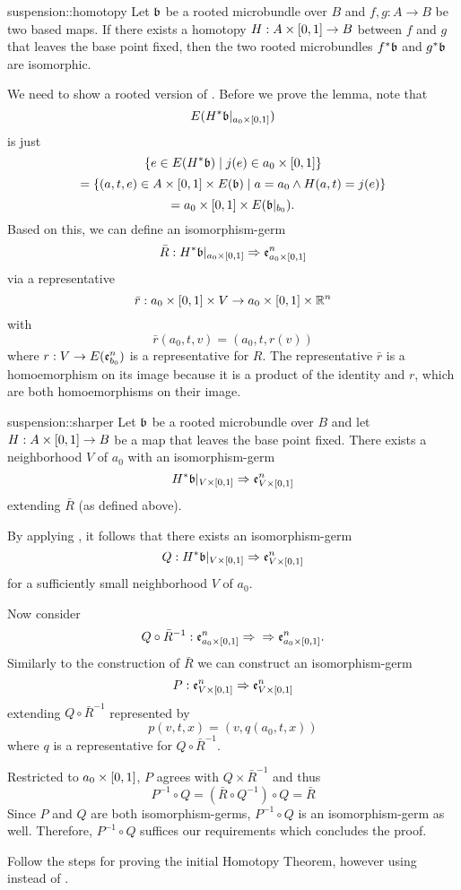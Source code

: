 \begin{mytheorem}{suspension::homotopy}
    Let $\mathfrak{b}$ be a rooted microbundle over $B$ and $f, g: A \to B$ be two based maps.
    If there exists a homotopy $H: A \times [0, 1] \to B$ between $f$ and $g$ that leaves the base point fixed,
    then the two rooted microbundles $f^*\mathfrak{b}$ and $g^*\mathfrak{b}$ are isomorphic.
\end{mytheorem}

\begin{myparagraph}
    We need to show a rooted version of .
    Before we prove the lemma, note that 
    \[ E(H^*\mathfrak{b}\vert_{a_0 \times [0, 1]}) \]
    is just
    \[ \{ e \in E(H^*\mathfrak{b}) \mid j(e) \in a_0 \times [0, 1] \} \]
    \[ = \{ (a, t, e) \in A \times [0, 1] \times E(\mathfrak{b}) \mid a = a_0 \land H(a, t) = j(e) \} \]
    \[ = a_0 \times [0, 1] \times E(\mathfrak{b}\vert_{b_0}). \]
    Based on this, we can define an isomorphism-germ
    \[ \bar{R}: H^*\mathfrak{b}\vert_{a_0 \times [0, 1]} \Rightarrow{}{} \mathfrak{e}^{n}_{a_0 \times [0, 1]} \]
    via a representative
    \[ \bar{r}: a_0 \times [0, 1] \times V \to a_0 \times [0, 1] \times \mathbb{R}^n \]
    with
    \[ \bar{r}(a_0, t, v) = (a_0, t, r(v) )\]
    where $r: V \to E(\mathfrak{e}^{n}_{b_0})$ is a representative for $R$.
    The representative $\bar{r}$ is a homoemorphism on its image
    because it is a product of the identity and $r$, which are both homoemorphisms on their image. 
\end{myparagraph}

\begin{mylemma}{suspension::sharper}
    Let $\mathfrak{b}$ be a rooted microbundle over $B$ and let $H: A \times [0, 1] \to B$ be a map that leaves the base point fixed.
    There exists a neighborhood $V$ of $a_0$ with an isomorphism-germ
    \[ H^*\mathfrak{b}\vert_{V \times [0, 1]} \Rightarrow{}{} \mathfrak{e}^{n}_{V \times [0, 1]} \]
    extending $\bar{R}$ (as defined above).
\end{mylemma}
\begin{myproof}
    By applying , it follows that there exists an isomorphism-germ
    \[ Q: H^*\mathfrak{b}\vert_{V \times [0, 1]} \Rightarrow{}{} \mathfrak{e}^{n}_{V \times [0, 1]} \]
    for a sufficiently small neighborhood $V$ of $a_0$.

    Now consider
    \[ Q \circ \bar{R}^{-1}: \mathfrak{e}^{n}_{a_0 \times [0, 1]} \Rightarrow{}{} \Rightarrow{} \mathfrak{e}^{n}_{a_0 \times [0, 1]}. \]
    Similarly to the construction of $\bar{R}$ we can construct an isomorphism-germ
    \[ P: \mathfrak{e}^{n}_{V \times [0, 1]} \Rightarrow{}{} \mathfrak{e}^{n}_{V \times [0, 1]} \]
    extending $Q \circ \bar{R}^{-1}$ represented by
    \[ p(v, t, x) = (v, q(a_0, t, x)) \]
    where $q$ is a representative for $Q \circ \bar{R}^{-1}$.

    Restricted to $a_0 \times [0, 1]$, $P$ agrees with $Q \times \bar{R}^{-1}$ and thus
    \[ P^{-1} \circ Q = (\bar{R} \circ Q^{-1}) \circ Q = \bar{R} \]
    Since $P$ and $Q$ are both isomorphism-germs, $P^{-1} \circ Q$ is an isomorphism-germ as well.
    Therefore, $P^{-1} \circ Q$ suffices our requirements which concludes the proof.
\end{myproof}

\begin{myproof}
    Follow the steps for proving the initial Homotopy Theorem,
    however using  instead of .
\end{myproof}